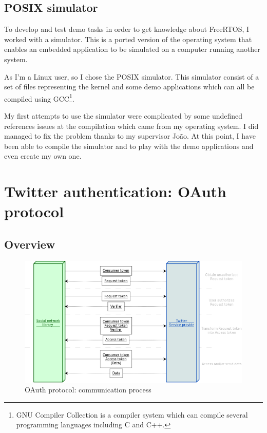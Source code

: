 \subsection{POSIX simulator}

\hspace{15mm}To develop and test demo tasks in order to get knowledge about FreeRTOS, I worked with a simulator. This is a ported version of the operating system that enables an embedded application to be simulated on a computer running another system.

As I'm a Linux user, so I chose the POSIX simulator. This simulator consist of a set of files representing the kernel and some demo applications which can all be compiled using GCC\footnote{GNU Compiler Collection is a compiler system which can compile several programming languages including C and C++.}.

My first attempts to use the simulator were complicated by some undefined references issues at the compilation which came from my operating system. I did managed to fix the problem thanks to my supervisor Jo\~{a}o. At this point, I have been able to compile the simulator and to play with the demo applications and even create my own one.



\section{Twitter authentication: OAuth protocol}

\subsection{Overview}

\begin{figure}[h]
  \centering
  \includegraphics[scale=0.75]{images/oauth.png}
  \caption{OAuth protocol: communication process}
\end{figure}

